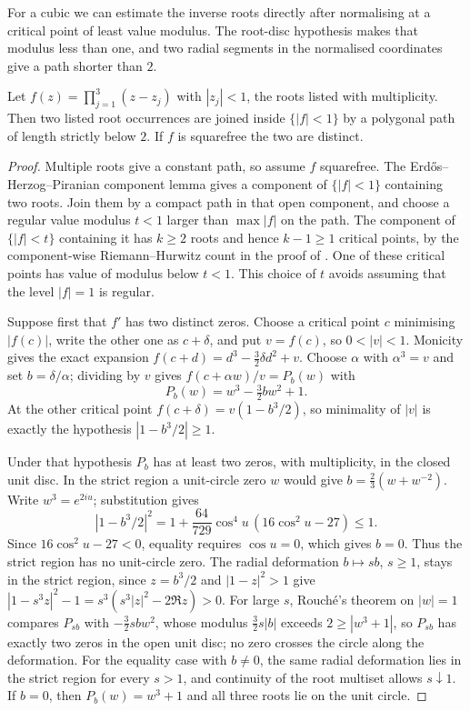 For a cubic we can estimate the inverse roots directly after normalising
at a critical point of least value modulus. The root-disc hypothesis
makes that modulus less than one, and two radial segments in the
normalised coordinates give a path shorter than $2$.


\begin{theorem}
\label{res:degree-three}
Let $f(z)=\prod_{j=1}^{3}(z-z_j)$ with $|z_j|<1$, the roots listed with
multiplicity.  Then two listed root occurrences are joined inside
$\{|f|<1\}$ by a polygonal path of length strictly below $2$.  If $f$ is
squarefree the two are distinct.
\end{theorem}

\begin{proof}
Multiple roots give a constant path, so assume $f$ squarefree.
The Erd\H{o}s--Herzog--Piranian component lemma
\cite[remark before Problem~5, p.~139]{ehp1958} gives a component of
$\{|f|<1\}$ containing two roots. Join them by a compact path in that
open component, and choose a regular value modulus $t<1$ larger than
$\max|f|$ on the path. The component of $\{|f|<t\}$ containing it has
$k\ge2$ roots and hence $k-1\ge1$ critical points, by the component-wise
Riemann--Hurwitz count in the proof of \cite[Proposition~2.1]{eks2010}.
One of these critical points has value of modulus below $t<1$. This
choice of $t$ avoids assuming that the level $|f|=1$ is regular.

Suppose first that $f'$ has two distinct zeros.  Choose a critical point $c$
minimising $|f(c)|$, write the other one as $c+\delta$, and put $v=f(c)$, so
$0<|v|<1$.  Monicity gives the exact expansion
$f(c+d)=d^3-\tfrac32\delta d^2+v$.  Choose $\alpha$ with $\alpha^3=v$ and set
$b=\delta/\alpha$; dividing by $v$ gives
$f(c+\alpha w)/v=P_b(w)$ with
\[
 P_b(w)=w^3-\tfrac32bw^2+1 .
\]
At the other critical point $f(c+\delta)=v(1-b^3/2)$, so minimality of $|v|$
is exactly the hypothesis $|1-b^3/2|\ge1$.

Under that hypothesis $P_b$ has at least two zeros, with multiplicity, in the
closed unit disc.  In the strict region a unit-circle zero $w$ would give
$b=\tfrac23(w+w^{-2})$. Write $w^3=e^{2iu}$; substitution gives
\[
 |1-b^3/2|^2
 =1+\frac{64}{729}\cos^4u\,(16\cos^2u-27)\le1.
\]
Since $16\cos^2u-27<0$, equality requires $\cos u=0$, which gives
$b=0$. Thus the strict region has no unit-circle zero.  The radial deformation $b\mapsto sb$, $s\ge1$, stays in
the strict region, since $z=b^3/2$ and $|1-z|^2>1$ give
$|1-s^3z|^2-1=s^3(s^3|z|^2-2\Re z)>0$.  For large $s$, Rouch\'e's theorem on
$|w|=1$ compares $P_{sb}$ with $-\tfrac32sbw^2$, whose modulus
$\tfrac32s|b|$ exceeds $2\ge|w^3+1|$, so $P_{sb}$ has exactly two zeros in
the open unit disc; no zero crosses the circle along the deformation.  For the equality case with $b\ne0$, the same radial deformation lies in
the strict region for every $s>1$, and continuity of the root multiset
allows $s\downarrow1$. If $b=0$, then $P_b(w)=w^3+1$ and all three
roots lie on the unit circle.


\end{proof}
